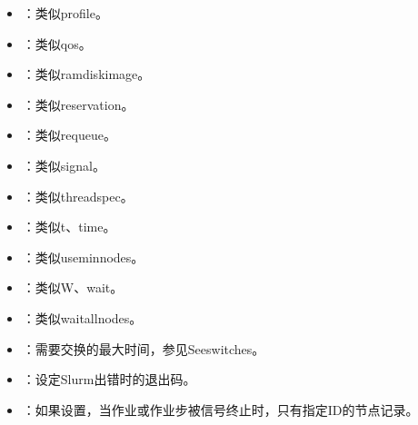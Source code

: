 \documentclass[a4paper,12pt,english]{sphinxmanual}
\begin{document}
\begin{itemize}
\item {} 
\sphinxAtStartPar
{}：类似\sphinxhyphen{}\sphinxhyphen{}profile。

\item {} 
\sphinxAtStartPar
{}：类似\sphinxhyphen{}\sphinxhyphen{}qos。

\item {} 
\sphinxAtStartPar
{}：类似\sphinxhyphen{}\sphinxhyphen{}ramdisk\sphinxhyphen{}image。

\item {} 
\sphinxAtStartPar
{}：类似\sphinxhyphen{}\sphinxhyphen{}reservation。

\item {} 
\sphinxAtStartPar
{}：类似\sphinxhyphen{}\sphinxhyphen{}requeue。

\item {} 
\sphinxAtStartPar
{}：类似\sphinxhyphen{}\sphinxhyphen{}signal。

\item {} 
\sphinxAtStartPar
{}：类似\sphinxhyphen{}\sphinxhyphen{}thread\sphinxhyphen{}spec。

\item {} 
\sphinxAtStartPar
{}：类似\sphinxhyphen{}t、\sphinxhyphen{}\sphinxhyphen{}time。

\item {} 
\sphinxAtStartPar
{}：类似\sphinxhyphen{}\sphinxhyphen{}use\sphinxhyphen{}min\sphinxhyphen{}nodes。

\item {} 
\sphinxAtStartPar
{}：类似\sphinxhyphen{}W、\sphinxhyphen{}\sphinxhyphen{}wait。

\item {} 
\sphinxAtStartPar
{}：类似\sphinxhyphen{}\sphinxhyphen{}wait\sphinxhyphen{}all\sphinxhyphen{}nodes。

\item {} 
\sphinxAtStartPar
{}：需要交换的最大时间，参见See\sphinxhyphen{}\sphinxhyphen{}switches。

\item {} 
\sphinxAtStartPar
{}：设定Slurm出错时的退出码。

\item {} 
\sphinxAtStartPar
{}：如果设置，当作业或作业步被信号终止时，只有指定ID的节点记录。

\end{itemize}
\end{document}
